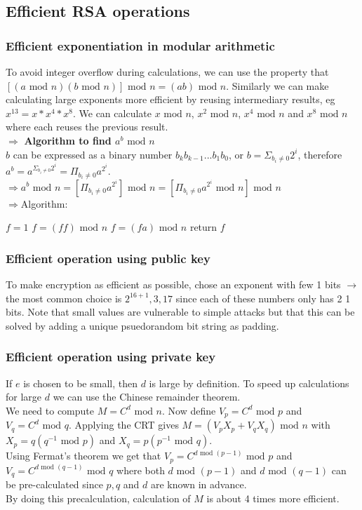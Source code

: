 \documentclass[12pt]{article}
\begin{document}
 \subsection{Efficient RSA operations}
 \subsubsection{Efficient exponentiation in modular arithmetic}
 To avoid integer overflow during calculations, we can use the property that $[(a\text{ mod }n)(b\text{ mod }n)]\text{ mod }n = (ab)\text{ mod }n$. Similarly we can make calculating large exponents more efficient by reusing intermediary results, eg $x^{13} = x*x^4*x^8$. We can calculate $x\text{ mod }n$, $x^2\text{ mod }n$, $x^4\text{ mod }n$ and $x^8\text{ mod }n$ where each reuses the previous result.\\
 $\Rightarrow$ \textbf{Algorithm to find $a^b\text{ mod }n$}\\
 $b$ can be expressed as a binary number $b_kb_{k-1}...b_1b_0$, or $b = \Sigma_{b_i\ne 0}2^i$, therefore $a^b = a^{\Sigma_{b_i\ne 0}2^i} = \Pi_{b_i\ne 0}a^{2^i}$.\\
 $\Rightarrow a^b\text{ mod }n = [\Pi_{b_i\ne 0}a^{2^i}]\text{ mod }n = [\Pi_{b_i\ne 0}a^{2^i}\text{ mod }n]\text{ mod }n $\\
 $\Rightarrow$Algorithm:
 \begin{algorithmic}
 	\State $f = 1$
 	\State $f = (ff)\text{ mod }n$
 	\State $f = (fa)\text{ mod }n$
 	\EndIf
	\EndFor
	\State return $f$
 \end{algorithmic}
 	
 \subsubsection{Efficient operation using public key}
 To make encryption as efficient as possible, chose an exponent with few 1 bits $\rightarrow$ the most common choice is $2^{16+1}, 3, 17$ since each of these numbers only has 2 1 bits. Note that small values are vulnerable to simple attacks but that this can be solved by adding a unique psuedorandom bit string as padding.
 
 \subsubsection{Efficient operation using private key}
 If $e$ is chosen to be small, then $d$ is large by definition. To speed up calculations for large $d$ we can use the Chinese remainder theorem.\\
 We need to compute $M = C^d\text{ mod }n$. Now define $V_p = C^d\text{ mod }p$ and $V_q = C^d\text{ mod }q$. Applying the CRT gives $M = (V_pX_p + V_qX_q)\text{ mod }n$ with $X_p = q(q^{-1}\text{ mod }p)$ and $X_q = p(p^{-1}\text{ mod }q)$.\\
 Using Fermat's theorem we get that $V_p = C^{d\text{ mod }(p-1)}\text{ mod }p$ and $V_q = C^{d\text{ mod }(q-1)}\text{ mod }q$ where both $d\text{ mod }(p-1)$ and $d\text{ mod }(q-1)$ can be pre-calculated since $p, q$ and $d$ are known in advance.\\
 By doing this precalculation, calculation of $M$ is about 4 times more efficient.
 
\end{document}
